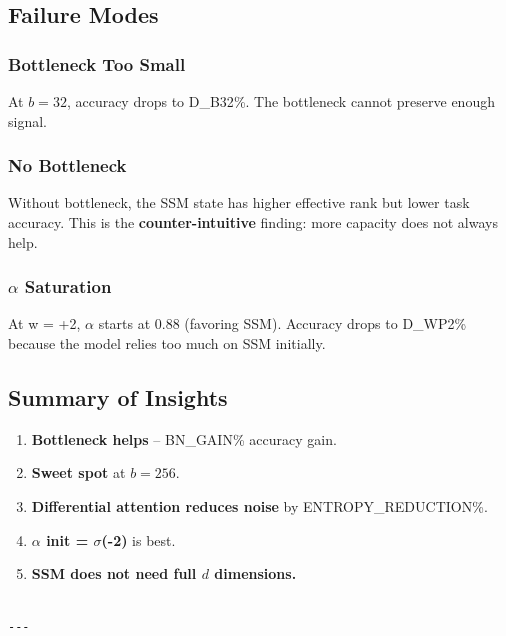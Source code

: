 \subsection{Failure Modes}

\subsubsection{Bottleneck Too Small}

At $b = 32$, accuracy drops to {{D\_B32}}\%. The bottleneck cannot preserve 
enough signal.

\subsubsection{No Bottleneck}

Without bottleneck, the SSM state has higher effective rank but lower 
task accuracy. This is the \textbf{counter-intuitive} finding: more capacity 
does not always help.

\subsubsection{$\alpha$ Saturation}

At w  = +2, $\alpha$ starts at 0.88 (favoring SSM). Accuracy drops to {{D\_WP2}}\% 
because the model relies too much on SSM initially.

\subsection{Summary of Insights}

\begin{enumerate}
\item \textbf{Bottleneck helps} -- {{{{BN\_GAIN}}\%}} accuracy gain.
\item \textbf{Sweet spot} at $b = 256$.
\item \textbf{Differential attention reduces noise} by {{ENTROPY\_REDUCTION}}\%.
\item \textbf{$\alpha$ init = $\sigma$(-2)} is best.
\item \textbf{SSM does not need full $d$ dimensions.}
\end{enumerate}
\begin{lstlisting}

---
\end{lstlisting}